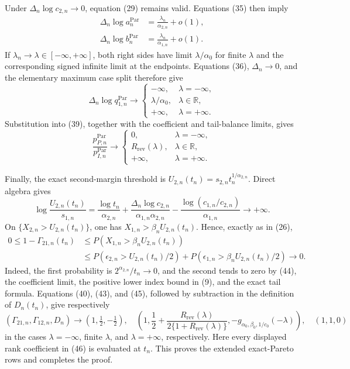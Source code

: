 Under \(\Delta_n\log c_{2,n}\to0\), equation (29) remains valid. Equations
(35) then imply
\[
\begin{aligned}
\Delta_n\log a_n^{\mathrm{Par}}
&=\frac{\lambda_n}{\alpha_{2,n}}+o(1),\\
\Delta_n\log b_n^{\mathrm{Par}}
&=\frac{\lambda_n}{\alpha_{1,n}}+o(1).
\end{aligned}
\tag{41}
\]
If \(\lambda_n\to\lambda\in[-\infty,+\infty]\), both right sides have
limit \(\lambda/\alpha_0\) for finite \(\lambda\) and the corresponding
signed infinite limit at the endpoints. Equations (36),
\(\Delta_n\to0\), and the elementary maximum case split therefore give
\[
\Delta_n\log q_{1,n}^{\mathrm{Par}}
\longrightarrow
\begin{cases}
-\infty,&\lambda=-\infty,\\
\lambda/\alpha_0,&\lambda\in\mathbb R,\\
+\infty,&\lambda=+\infty.
\end{cases}
\tag{42}
\]
Substitution into (39), together with the coefficient and tail-balance limits,
gives
\[
\frac{p_{P,n}^{\mathrm{Par}}}{p_{I,n}^{\mathrm{Par}}}
\longrightarrow
\begin{cases}
0,&\lambda=-\infty,\\
R_{\mathrm{rev}}(\lambda),&\lambda\in\mathbb R,\\
+\infty,&\lambda=+\infty.
\end{cases}
\tag{43}
\]

Finally, the exact second-margin threshold is
\(U_{2,n}(t_n)=s_{2,n}t_n^{1/\alpha_{2,n}}\). Direct algebra gives
\[
\log\frac{U_{2,n}(t_n)}{s_{1,n}}
=\frac{\log t_n}{\alpha_{2,n}}
+\frac{\Delta_n\log c_{2,n}}{\alpha_{1,n}\alpha_{2,n}}
-\frac{\log(c_{1,n}/c_{2,n})}{\alpha_{1,n}}
\longrightarrow+\infty.
\tag{44}
\]
On \(\{X_{2,n}>U_{2,n}(t_n)\}\), one has
\(X_{1,n}>\beta_nU_{2,n}(t_n)\). Hence, exactly as in (26),
\[
\begin{aligned}
0\leq1-\Gamma_{21,n}(t_n)
&\leq P(X_{1,n}>\beta_nU_{2,n}(t_n))\\
&\leq P(\epsilon_{2,n}>U_{2,n}(t_n)/2)
+P(\epsilon_{1,n}>\beta_nU_{2,n}(t_n)/2)\longrightarrow0.
\end{aligned}
\tag{45}
\]
Indeed, the first probability is \(2^{\alpha_{2,n}}/t_n\to0\), and the
second tends to zero by (44), the coefficient limit, the positive lower index
bound in (9), and the exact tail formula. Equations (40), (43), and (45),
followed by subtraction in the definition of \(D_n(t_n)\), give respectively
\[
(\Gamma_{21,n},\Gamma_{12,n},D_n)
\longrightarrow(1,\tfrac12,-\tfrac12),
\quad
\left(1,\frac12+\frac{R_{\mathrm{rev}}(\lambda)}
{2\{1+R_{\mathrm{rev}}(\lambda)\}},
-g_{\alpha_0,\beta_0,1/c_0}(-\lambda)\right),
\quad
(1,1,0)
\tag{46}
\]
in the cases \(\lambda=-\infty\), finite \(\lambda\), and
\(\lambda=+\infty\), respectively. Here every displayed rank coefficient
in (46) is evaluated at \(t_n\). This proves the extended exact-Pareto rows and
completes the proof.